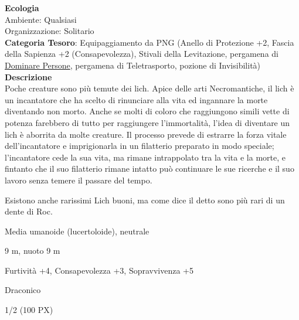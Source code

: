 \begin{multicols}{2}
{\textbf{Ecologia}\\
Ambiente: Qualsiasi\\
Organizzazione: Solitario\\
\textbf{Categoria Tesoro}: Equipaggiamento da PNG (Anello di Protezione +2, Fascia della Sapienza +2 (Consapevolezza), Stivali della Levitazione, pergamena di \hyperlink{Dominare Persone}{Dominare Persone}, pergamena di Teletrasporto, pozione di Invisibilità)\\
\textbf{Descrizione}\\
Poche creature sono più temute dei lich. Apice delle arti Necromantiche, il lich è un incantatore che ha scelto di rinunciare alla vita ed ingannare la morte diventando non morto. Anche se molti di coloro che raggiungono simili vette di potenza farebbero di tutto per raggiungere l'immortalità, l'idea di diventare un lich è aborrita da molte creature. Il processo prevede di estrarre la forza vitale dell'incantatore e imprigionarla in un filatterio preparato in modo speciale; l'incantatore cede la sua vita, ma rimane intrappolato tra la vita e la morte, e fintanto che il suo filatterio rimane intatto può continuare le sue ricerche e il suo lavoro senza temere il passare del tempo.

Esistono anche rarissimi Lich buoni, ma come dice il detto sono più rari di un dente di Roc.

\begin{description}[noitemsep, topsep=0pt, parsep=0pt, partopsep=0pt, itemsep=1pt, leftmargin=2.35cm,  labelwidth=2.2cm, itemindent=0cm, listparindent=0pt] %
\setlength{\baselineskip}{10pt}
\item[\textbf{Taglia/Tipo}] Media umanoide (lucertoloide), neutrale
\item[\textbf{Caratt.}] 
\item[\textbf{Punti Ferita}] 
\item[\textbf{Movimento}] 9 m, nuoto 9 m
\item[\textbf{Tiri Salvez.}] 
\item[\textbf{Comp.}] Furtività +4, Consapevolezza +3, Sopravvivenza +5
\item[\textbf{Linguaggi}] Draconico
\item[\textbf{Sfida}] 1/2 (100 PX)
\end{description}
\smallskip

}
\end{multicols}
